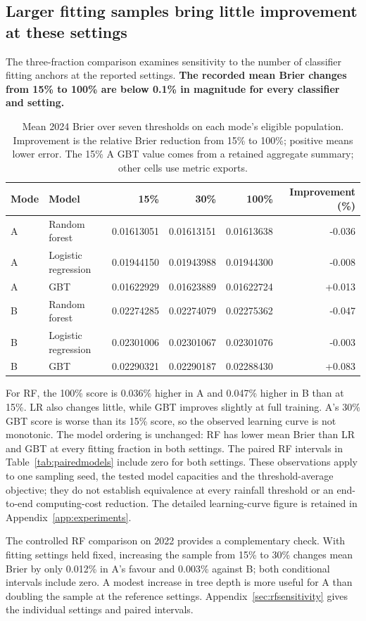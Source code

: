\documentclass[11pt,a4paper]{article}
\begin{document}
\subsection{Larger fitting samples bring little improvement at these settings}
The three-fraction comparison examines sensitivity to the number of classifier fitting anchors at the reported settings. \textbf{The recorded mean Brier changes from 15\% to 100\% are below 0.1\% in magnitude for every classifier and setting.}
\begin{table}[!ht]\centering\small
\begin{tabular}{llrrrr}\toprule
Mode & Model & 15\% & 30\% & 100\% & Improvement (\%)\\\midrule
A & Random forest & 0.01613051 & 0.01613151 & 0.01613638 & -0.036 \\
A & Logistic regression & 0.01944150 & 0.01943988 & 0.01944300 & -0.008 \\
A & GBT & 0.01622929 & 0.01623889 & 0.01622724 & +0.013 \\
B & Random forest & 0.02274285 & 0.02274079 & 0.02275362 & -0.047 \\
B & Logistic regression & 0.02301006 & 0.02301067 & 0.02301076 & -0.003 \\
B & GBT & 0.02290321 & 0.02290187 & 0.02288430 & +0.083 \\
\bottomrule\end{tabular}
\caption{Mean 2024 Brier over seven thresholds on each mode's eligible population. Improvement is the relative Brier reduction from 15\% to 100\%; positive means lower error. The 15\% A GBT value comes from a retained aggregate summary; other cells use metric exports.}\label{tab:trainingsampling}
\end{table}
For RF, the 100\% score is 0.036\% higher in A and 0.047\% higher in B than at 15\%. LR also changes little, while GBT improves slightly at full training. A's 30\% GBT score is worse than its 15\% score, so the observed learning curve is not monotonic. The model ordering is unchanged: RF has lower mean Brier than LR and GBT at every fitting fraction in both settings. The paired RF intervals in Table~\ref{tab:pairedmodels} include zero for both settings. These observations apply to one sampling seed, the tested model capacities and the threshold-average objective; they do not establish equivalence at every rainfall threshold or an end-to-end computing-cost reduction. The detailed learning-curve figure is retained in Appendix~\ref{app:experiments}.

The controlled RF comparison on 2022 provides a complementary check. With fitting settings held fixed, increasing the sample from 15\% to 30\% changes mean Brier by only 0.012\% in A's favour and 0.003\% against B; both conditional intervals include zero. A modest increase in tree depth is more useful for A than doubling the sample at the reference settings. Appendix~\ref{sec:rfsensitivity} gives the individual settings and paired intervals.
\end{document}
